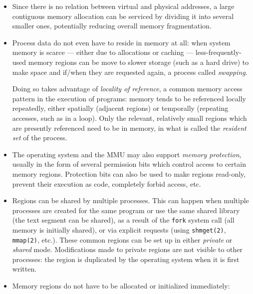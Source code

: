 \begin{itemize}
    \item
        Since there is no relation between virtual and physical addresses, a
        large contiguous memory allocation can be serviced by dividing it into
        several smaller ones, potentially reducing overall memory fragmentation.
    \item
        Process data do not even have to reside in memory at all: when system
        memory is scarce --- either due to allocations or caching ---
        less-frequently-used memory regions can be move to slower storage (such
        as a hard drive) to make space and if/when they are requested again, a
        process called \textit{swapping}.

        Doing so takes advantage of \textit{locality of reference}, a common
        memory access pattern in the execution of programs: memory tends to be
        referenced locally repeatedly, either spatially (adjacent regions) or
        temporally (repeating accesses, such as in a loop).  Only the relevant,
        relatively small regions which are presently referenced need to be in
        memory, in what is called the \textit{resident set} of the
        process\footnotemark.
    \item
        The operating system and the MMU may also support \textit{memory
        protection}, usually in the form of several permission bits which
        control access to certain memory regions.  Protection bits can also be
        used to make regions read-only, prevent their execution as code,
        completely forbid access, etc.
    \item
        Regions can be shared by multiple processes.  This can happen when
        multiple processes are created for the same program or use the same
        shared library (the text segment can be shared), as a result of the
        \texttt{fork} system call (all memory is initially shared), or via
        explicit requests (using \texttt{shmget(2)}, \texttt{mmap(2)}, etc.).
        These common regions can be set up in either \textit{private} or
        \textit{shared} mode.  Modifications made to private regions are not
        visible to other processes: the region is duplicated by the operating
        system when it is first written.
    \item
        Memory regions do not have to be allocated or initialized immediately:

\end{itemize}
